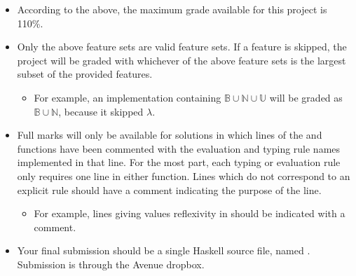 \documentclass{exam}
\let\OldTexttt\texttt
\renewcommand{\texttt}[1]{\OldTexttt{\color{teal}{#1}}}
\begin{document}
\begin{itemize}
\item According to the above, the maximum grade available for this project is 110\%. 
\item Only the above feature sets are valid feature sets.  If a feature is skipped, the project will be graded with whichever of the above feature sets is the largest subset of the provided features.  
\begin{itemize}
\item For example, an implementation containing $\mathbb{B} \cup \mathbb{N} \cup \mathbb{U}$ will be graded as $\mathbb{B} \cup \mathbb{N}$, because it skipped $\lambda$.
\end{itemize}
\item Full marks will only be available for solutions in which lines of the \texttt{ssos} and \texttt{typeCheck} functions have been commented with the evaluation and typing rule names implemented in that line.  For the most part, each typing or evaluation rule only requires one line in either function.  Lines which do not correspond to an explicit rule should have a comment indicating the purpose of the line.
\begin{itemize}
\item For example, lines giving values reflexivity in \texttt{ssos} should be indicated with a comment.  
\end{itemize}
\item Your final submission should be a single Haskell source file, named \texttt{<Your MacID>.hs}.  Submission is through the Avenue dropbox.  
\end{itemize}
\end{document}
